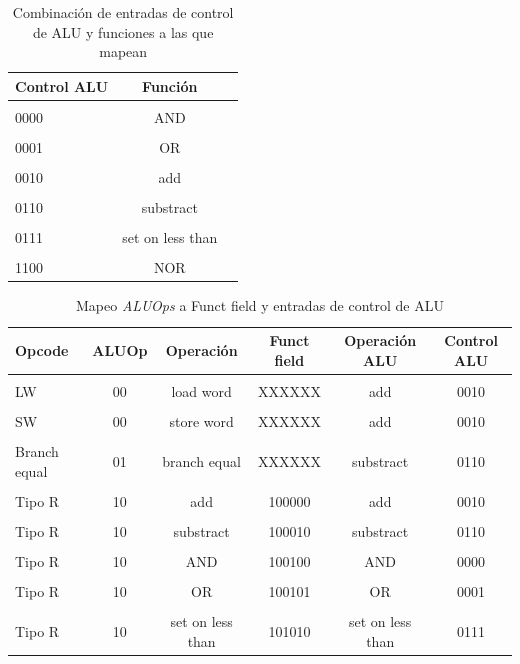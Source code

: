 \documentclass[12pt]{article}
\begin{document}
\begin{table}[!ht]
\centering
\caption{Combinación de entradas de control de ALU y funciones a las que mapean}
\label{tab:alucontrol}
\smallskip
\begin{tabular}{l c c}
\hline
Control ALU & Función \\[0.5ex]
\hline
&&\\[-2ex]
0000 & AND \\[0.5ex]
\hline
&&\\[-2ex]
0001 & OR\\[0.5ex]
\hline
&&\\[-2ex]
0010 & add\\[0.5ex]
\hline
&&\\[-2ex]
0110 & substract\\[0.5ex]
\hline
&&\\[-2ex]
0111 & set on less than\\[0.5ex]
\hline
&&\\[-2ex]
1100 & NOR\\[0.5ex]
\hline
\end{tabular}
\end{table}

\begin{table}[!ht]
\centering
\caption{Mapeo \textit{ALUOps} a Funct field y entradas de control de ALU}
\label{tab:alucontrolops}
\smallskip
\begin{tabular}{l c c c c c}
\hline
Opcode & ALUOp & Operación & Funct field & Operación ALU & Control ALU\\[0.5ex]
\hline
&&\\[-2ex]
LW & 00 & load word & XXXXXX & add & 0010\\[0.5ex]
\hline
&&\\[-2ex]
SW & 00 & store word & XXXXXX & add & 0010\\[0.5ex]
\hline
&&\\[-2ex]
Branch equal & 01 & branch equal & XXXXXX & substract & 0110\\[0.5ex]
\hline
&&\\[-2ex]
Tipo R & 10 & add & 100000 & add & 0010\\[0.5ex]
\hline
&&\\[-2ex]
Tipo R & 10 & substract & 100010 & substract & 0110\\[0.5ex]
\hline
&&\\[-2ex]
Tipo R & 10 & AND & 100100 & AND & 0000\\[0.5ex]
\hline
&&\\[-2ex]
Tipo R & 10 & OR & 100101 & OR & 0001\\[0.5ex]
\hline
&&\\[-2ex]
Tipo R & 10 & set on less than & 101010 & set on less than & 0111\\[0.5ex]
\hline
\end{tabular}
\end{table}
\end{document}
